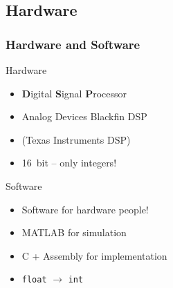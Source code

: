 \subsection{Hardware}
\begin{frame}
    \frametitle{Hardware and Software}
    \begin{block}{Hardware}
        \begin{itemize}
        \item \textbf{D}igital \textbf{S}ignal \textbf{P}rocessor
        \item Analog Devices Blackfin DSP
        \item (Texas Instruments DSP)
        \item \SI{16}{bit} -- only integers!
        \end{itemize}
    \end{block}

    \pause
    \begin{block}{Software}
        \begin{itemize}
        \item Software for hardware people!
        \item MATLAB for simulation
        \item C + Assembly for implementation
        \item \texttt{float} $\rightarrow$ \texttt{int}
        \end{itemize}
    \end{block}
\end{frame}


